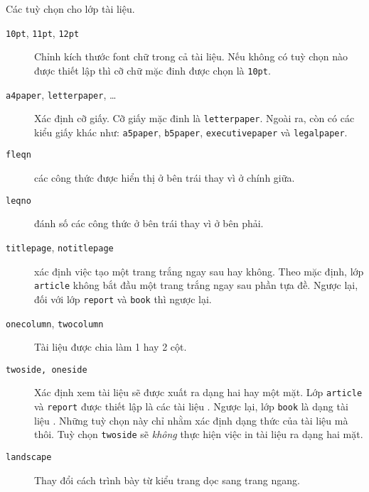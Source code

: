 \begin{table}[!bp]
\caption{Các tuỳ chọn cho lớp tài liệu.} \label{options}
\begin{lined}{13cm}
\begin{flushleft}
\begin{description}
\item[\normalfont\texttt{10pt}, \texttt{11pt}, \texttt{12pt}]
\quad  Chỉnh kích thước font chữ trong cả tài liệu. Nếu không có tuỳ chọn nào được thiết lập thì cỡ chữ mặc đinh được chọn là
\texttt{10pt}.

\item[\normalfont\texttt{a4paper}, \texttt{letterpaper}, \ldots]
\quad  Xác định cỡ giấy. Cỡ giấy mặc đinh là \texttt{letterpaper}. Ngoài ra, còn có các kiểu giấy khác như: \texttt{a5paper},
\texttt{b5paper}, \texttt{executivepaper}
  và \texttt{legalpaper}. 
   

\item[\normalfont\texttt{fleqn}] \quad các công thức được hiển thị ở bên trái thay vì ở chính giữa.

\item[\normalfont\texttt{leqno}] \quad đánh số các công thức ở bên trái thay vì ở bên phải.

\item[\normalfont\texttt{titlepage}, \texttt{notitlepage}] \quad xác định việc tạo một trang trắng ngay sau  hay không. Theo mặc định, lớp \texttt{article} không bắt đầu một trang trắng ngay sau phần tựa đề. Ngược lại, đối với lớp \texttt{report} và \texttt{book} thì ngược lại.

\item[\normalfont\texttt{onecolumn}, \texttt{twocolumn}] \quad Tài liệu được chia làm 1 hay 2 cột.

\item[\normalfont\texttt{twoside, oneside}] \quad Xác định xem tài liệu sẽ được xuất ra dạng hai hay một mặt. Lớp
\texttt{article} và \texttt{report} được thiết lập là các tài liệu . Ngược lại, lớp \texttt{book} là dạng tài liệu . Những tuỳ chọn này chỉ nhằm xác định dạng thức của tài liệu mà thôi. Tuỳ chọn \texttt{twoside} sẽ \emph{ không} thực hiện việc in tài liệu ra dạng hai mặt.

\item[\normalfont\texttt{landscape}] \quad Thay đổi cách trình bày từ kiểu trang dọc sang trang ngang.


\end{description}
\end{flushleft}
\end{lined}
\end{table}
